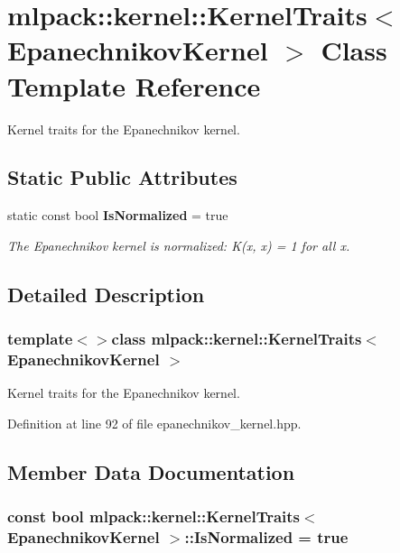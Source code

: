 \section{mlpack\-:\-:kernel\-:\-:Kernel\-Traits$<$ Epanechnikov\-Kernel $>$ Class Template Reference}
\label{classmlpack_1_1kernel_1_1KernelTraits_3_01EpanechnikovKernel_01_4}


Kernel traits for the Epanechnikov kernel.  


\subsection*{Static Public Attributes}
\begin{DoxyCompactItemize}
\item 
static const bool {\bf Is\-Normalized} = true
\begin{DoxyCompactList}\small\item\em The Epanechnikov kernel is normalized\-: K(x, x) = 1 for all x. \end{DoxyCompactList}\end{DoxyCompactItemize}


\subsection{Detailed Description}
\subsubsection*{template$<$$>$class mlpack\-::kernel\-::\-Kernel\-Traits$<$ Epanechnikov\-Kernel $>$}

Kernel traits for the Epanechnikov kernel. 

Definition at line 92 of file epanechnikov\-\_\-kernel.\-hpp.



\subsection{Member Data Documentation}
\subsubsection[{Is\-Normalized}]{\setlength{\rightskip}{0pt plus 5cm}const bool {\bf mlpack\-::kernel\-::\-Kernel\-Traits}$<$ {\bf Epanechnikov\-Kernel} $>$\-::Is\-Normalized = true\hspace{0.3cm}{\ttfamily [static]}}\label{classmlpack_1_1kernel_1_1KernelTraits_3_01EpanechnikovKernel_01_4_afc1cd6ad76e8ece656410968349a61b6}


